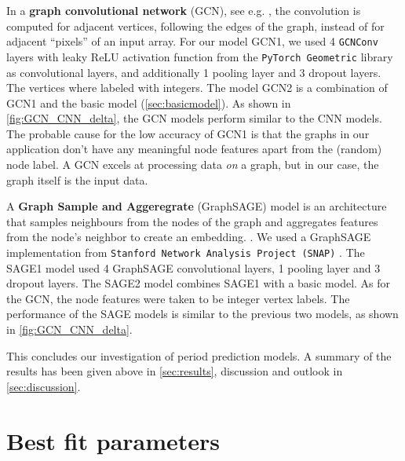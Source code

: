 \documentclass[12pt]{article}
\numberwithin{equation}{section}
\begin{document}
In a \textbf{graph convolutional network} (GCN), see e.g. \cite{kipf_semisupervised_2017}, the convolution is computed for adjacent vertices, following the edges of the graph, instead of for adjacent \enquote{pixels} of an input array.  
For our model GCN1, we used 4 \texttt{GCNConv} layers with leaky ReLU activation function from the \texttt{PyTorch Geometric} library  as convolutional layers, and additionally 1 pooling layer and 3 dropout layers. The vertices where labeled with integers. The model GCN2 is a combination of GCN1 and the basic model (\cref{sec:basicmodel}). As shown in \cref{fig:GCN_CNN_delta}, the GCN models perform similar to the CNN models. The probable cause for the low accuracy of GCN1 is that the graphs in our application don't have any meaningful node features apart from the (random) node label. A GCN excels at processing data \emph{on} a graph, but in our case, the graph itself is the input data. 






A \textbf{Graph Sample and Aggeregrate} (GraphSAGE) model is an architecture that samples neighbours from the nodes of the graph and aggregates features from the node's neighbor to create an embedding.   \cite{hamilton_inductive_2017a}.  We used a GraphSAGE implementation from \texttt{Stanford Network Analysis Project (SNAP)}  \cite{leskovec_snap_2016}. The SAGE1 model used 4 GraphSAGE convolutional layers, 1 pooling layer and 3 dropout layers. The SAGE2 model combines SAGE1 with a basic model.   As for the GCN, the node features were taken to be integer vertex labels. The performance of the SAGE models is similar to the previous two models, as shown in \cref{fig:GCN_CNN_delta}.


\bigskip
\noindent
This concludes our investigation of period prediction models. A summary of the results has been given above in \cref{sec:results}, discussion and outlook  in \cref{sec:discussion}.



\newpage 

\appendix


\section{Best fit parameters}
\end{document}
